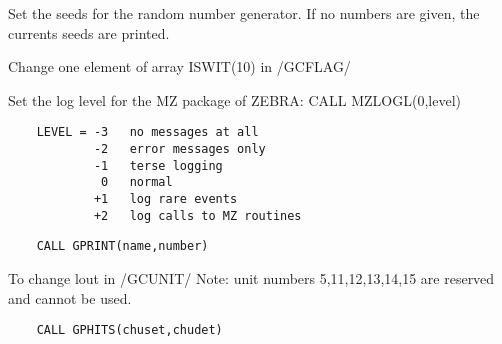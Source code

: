    \par
Set the seeds for the random number generator. If no numbers are given, the 
   currents seeds are printed.  

\ENDCMD


\BEGARG
{}
\ENDARG

   \par
Change one element of array ISWIT(10) in /GCFLAG/ 

\ENDCMD


\BEGARG
{}
\ENDARG

   \par
Set the log level for the MZ package of ZEBRA: CALL MZLOGL(0,level) 
\begin{verbatim}
    LEVEL = -3   no messages at all
            -2   error messages only
            -1   terse logging
             0   normal
            +1   log rare events
            +2   log calls to MZ routines
\end{verbatim}

\ENDCMD


\BEGARG
{}
\ENDARG

\begin{verbatim}
    CALL GPRINT(name,number)
\end{verbatim}

\ENDCMD


\BEGARG
{}
\ENDARG

   \par
To change lout in /GCUNIT/ Note: unit numbers 5,11,12,13,14,15 are reserved 
   and cannot be used.  

\ENDCMD


\BEGARG
{}
\ENDARG

\begin{verbatim}
    CALL GPHITS(chuset,chudet)
\end{verbatim}

